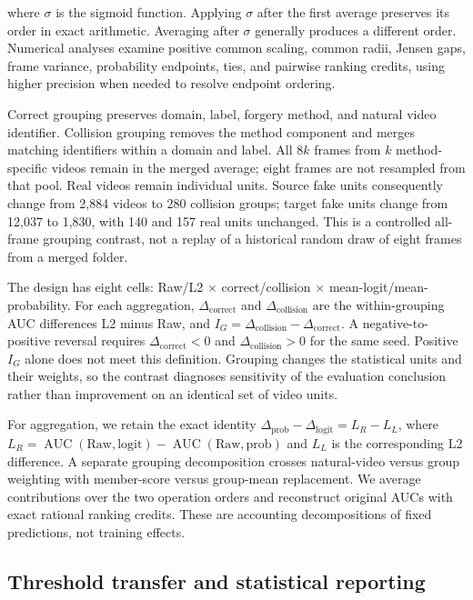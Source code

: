 \documentclass{ieeeaccess}
\begin{document}
where \(\sigma\) is the sigmoid function. Applying \(\sigma\) after the
first average preserves its order in exact arithmetic. Averaging after
\(\sigma\) generally produces a different order. Numerical analyses
examine positive common scaling, common radii, Jensen gaps, frame
variance, probability endpoints, ties, and pairwise ranking credits,
using higher precision when needed to resolve endpoint ordering.

Correct grouping preserves domain, label, forgery method, and natural
video identifier. Collision grouping removes the method component and
merges matching identifiers within a domain and label. All \(8k\) frames
from \(k\) method-specific videos remain in the merged average; eight
frames are not resampled from that pool. Real videos remain individual
units. Source fake units consequently change from 2,884 videos to 280
collision groups; target fake units change from 12,037 to 1,830, with
140 and 157 real units unchanged. This is a controlled all-frame
grouping contrast, not a replay of a historical random draw of eight
frames from a merged folder.

The design has eight cells: Raw/L2 \(\times\) correct/collision
\(\times\) mean-logit/mean-probability. For each aggregation,
\(\Delta_{\mathrm{correct}}\) and \(\Delta_{\mathrm{collision}}\) are
the within-grouping AUC differences L2 minus Raw, and
\(I_G=\Delta_{\mathrm{collision}}-\Delta_{\mathrm{correct}}\). A
negative-to-positive reversal requires \(\Delta_{\mathrm{correct}}<0\)
and \(\Delta_{\mathrm{collision}}>0\) for the same seed. Positive
\(I_G\) alone does not meet this definition. Grouping changes the
statistical units and their weights, so the contrast diagnoses
sensitivity of the evaluation conclusion rather than improvement on an
identical set of video units.

For aggregation, we retain the exact identity
\(\Delta_{\mathrm{prob}}-\Delta_{\mathrm{logit}}=L_R-L_L\), where
\(L_R=\operatorname{AUC}(\mathrm{Raw,logit})-\operatorname{AUC}(\mathrm{Raw,prob})\)
and \(L_L\) is the corresponding L2 difference. A separate grouping
decomposition crosses natural-video versus group weighting with
member-score versus group-mean replacement. We average contributions
over the two operation orders and reconstruct original AUCs with exact
rational ranking credits. These are accounting decompositions of fixed
predictions, not training effects.

\subsection{Threshold transfer and statistical
reporting}\label{threshold-transfer-and-statistical-reporting}
\end{document}
